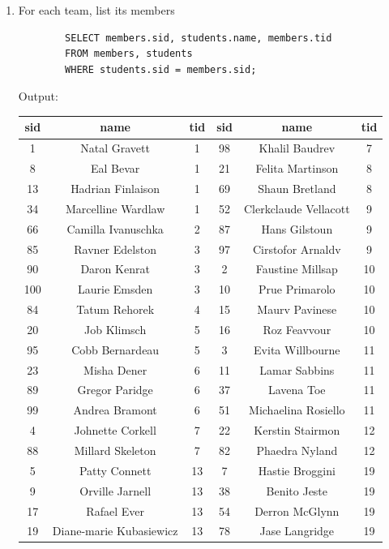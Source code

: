 \documentclass[11pt,letterpaper]{article}
\begin{document}
\begin{enumerate}
		\item For each team, list its members
		\begin{verbatim}
		SELECT members.sid, students.name, members.tid 
		FROM members, students 
		WHERE students.sid = members.sid;
		\end{verbatim}
		Output:
		\begin{center}
			\begin{tabular}{ | c  c  c |  c c c | }
				\hline
				sid & name & tid & sid & name & tid \\
				\hline
				1 & Natal Gravett & 1 & 98 & Khalil Baudrev & 7 \\
				8 & Eal Bevar & 1 & 21 & Felita Martinson & 8 \\
				13 & Hadrian Finlaison & 1 & 69 & Shaun Bretland & 8 \\
				34 & Marcelline Wardlaw & 1 & 52 & Clerkclaude Vellacott & 9 \\
				
				66 & Camilla Ivanuschka & 2 & 87 & Hans Gilstoun & 9 \\
				85 & Ravner Edelston & 3 & 97 & Cirstofor Arnaldv & 9 \\
				90 & Daron Kenrat & 3 & 2 & Faustine Millsap & 10 \\
				100 & Laurie Emsden & 3 & 10 & Prue Primarolo & 10 \\
				
				84 & Tatum Rehorek & 4 & 15 & Maurv Pavinese & 10 \\
				20 & Job Klimsch & 5 & 16 & Roz Feavvour & 10 \\
				95 & Cobb Bernardeau & 5 & 3 & Evita Willbourne & 11 \\
				23 & Misha Dener & 6 & 11 & Lamar Sabbins & 11 \\
				
				89 & Gregor Paridge & 6 & 37 & Lavena Toe & 11 \\
				99 & Andrea Bramont & 6 & 51 & Michaelina Rosiello & 11 \\
				4 & Johnette Corkell & 7 & 22 & Kerstin Stairmon & 12 \\
				88 & Millard Skeleton & 7 & 82 & Phaedra Nyland & 12 \\
				\hline
				\hline
				5 & Patty Connett & 13 & 7 & Hastie Broggini & 19 \\
				9 & Orville Jarnell & 13 & 38 & Benito Jeste & 19 \\
				17 & Rafael Ever & 13 & 54 & Derron McGlynn & 19 \\
				19 & Diane-marie Kubasiewicz & 13 & 78 & Jase Langridge & 19 \\
				

\end{tabular}
\end{center}
\end{enumerate}
\end{document}
